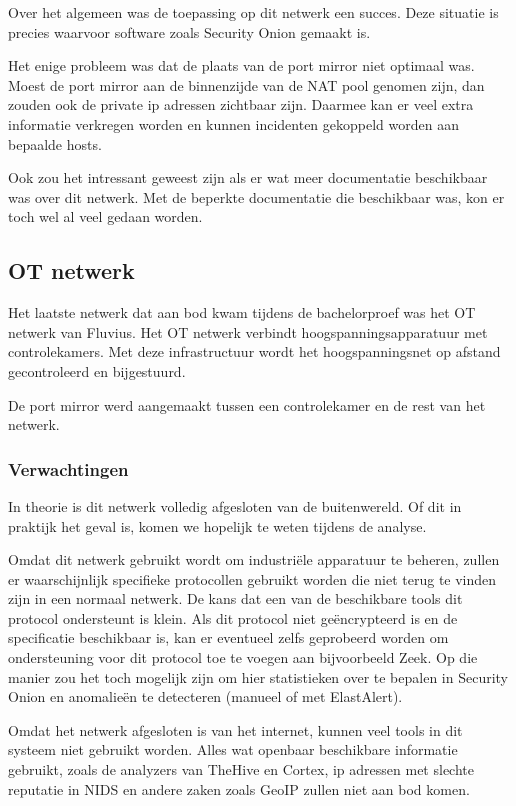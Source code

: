 \documentclass[a4paper,12pt]{report}
\begin{document}
Over het algemeen was de toepassing op dit netwerk een succes.
Deze situatie is precies waarvoor software zoals Security Onion gemaakt is.

Het enige probleem was dat de plaats van de port mirror niet optimaal was.
Moest de port mirror aan de binnenzijde van de NAT pool genomen zijn, dan zouden ook de private ip adressen zichtbaar zijn.
Daarmee kan er veel extra informatie verkregen worden en kunnen incidenten gekoppeld worden aan bepaalde hosts.

Ook zou het intressant geweest zijn als er wat meer documentatie beschikbaar was over dit netwerk.
Met de beperkte documentatie die beschikbaar was, kon er toch wel al veel gedaan worden.

\subsection{OT netwerk}
\label{sec:ot-netwerk}
Het laatste netwerk dat aan bod kwam tijdens de bachelorproef was het OT netwerk van Fluvius.
Het OT netwerk verbindt hoogspanningsapparatuur met controlekamers.
Met deze infrastructuur wordt het hoogspanningsnet op afstand gecontroleerd en bijgestuurd.

De port mirror werd aangemaakt tussen een controlekamer en de rest van het netwerk.

\subsubsection{Verwachtingen}
In theorie is dit netwerk volledig afgesloten van de buitenwereld.
Of dit in praktijk het geval is, komen we hopelijk te weten tijdens de analyse.

Omdat dit netwerk gebruikt wordt om industriële apparatuur te beheren, zullen er waarschijnlijk specifieke protocollen gebruikt worden die niet terug te vinden zijn in een normaal netwerk.
De kans dat een van de beschikbare tools dit protocol ondersteunt is klein.
Als dit protocol niet geëncrypteerd is en de specificatie beschikbaar is, kan er eventueel zelfs geprobeerd worden om ondersteuning voor dit protocol toe te voegen aan bijvoorbeeld Zeek.
Op die manier zou het toch mogelijk zijn om hier statistieken over te bepalen in Security Onion en anomalieën te detecteren (manueel of met ElastAlert).

Omdat het netwerk afgesloten is van het internet, kunnen veel tools in dit systeem niet gebruikt worden.
Alles wat openbaar beschikbare informatie gebruikt, zoals de analyzers van TheHive en Cortex, ip adressen met slechte reputatie in NIDS en andere zaken zoals GeoIP zullen niet aan bod komen.
\end{document}
